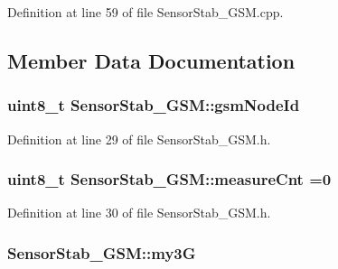 Definition at line 59 of file Sensor\+Stab\+\_\+\+G\+S\+M.\+cpp.



\subsection{Member Data Documentation}
\subsubsection[{\texorpdfstring{gsm\+Node\+Id}{gsmNodeId}}]{\setlength{\rightskip}{0pt plus 5cm}uint8\+\_\+t Sensor\+Stab\+\_\+\+G\+S\+M\+::gsm\+Node\+Id\hspace{0.3cm}{\ttfamily [private]}}\hypertarget{class_sensor_stab___g_s_m_aab1282700ef9e76f861a811e0b06c9f6}{}\label{class_sensor_stab___g_s_m_aab1282700ef9e76f861a811e0b06c9f6}


Definition at line 29 of file Sensor\+Stab\+\_\+\+G\+S\+M.\+h.

\subsubsection[{\texorpdfstring{measure\+Cnt}{measureCnt}}]{\setlength{\rightskip}{0pt plus 5cm}uint8\+\_\+t Sensor\+Stab\+\_\+\+G\+S\+M\+::measure\+Cnt =0\hspace{0.3cm}{\ttfamily [private]}}\hypertarget{class_sensor_stab___g_s_m_ab3626e426569a7b2d32f9a74233d2706}{}\label{class_sensor_stab___g_s_m_ab3626e426569a7b2d32f9a74233d2706}


Definition at line 30 of file Sensor\+Stab\+\_\+\+G\+S\+M.\+h.

\subsubsection[{\texorpdfstring{my3G}{my3G}}]{ Sensor\+Stab\+\_\+\+G\+S\+M\+::my3G\hspace{0.3cm}{\ttfamily [private]}}\hypertarget{class_sensor_stab___g_s_m_a9f1e14e998706c0c4af29c3a967ebea1}{}\label{class_sensor_stab___g_s_m_a9f1e14e998706c0c4af29c3a967ebea1}


